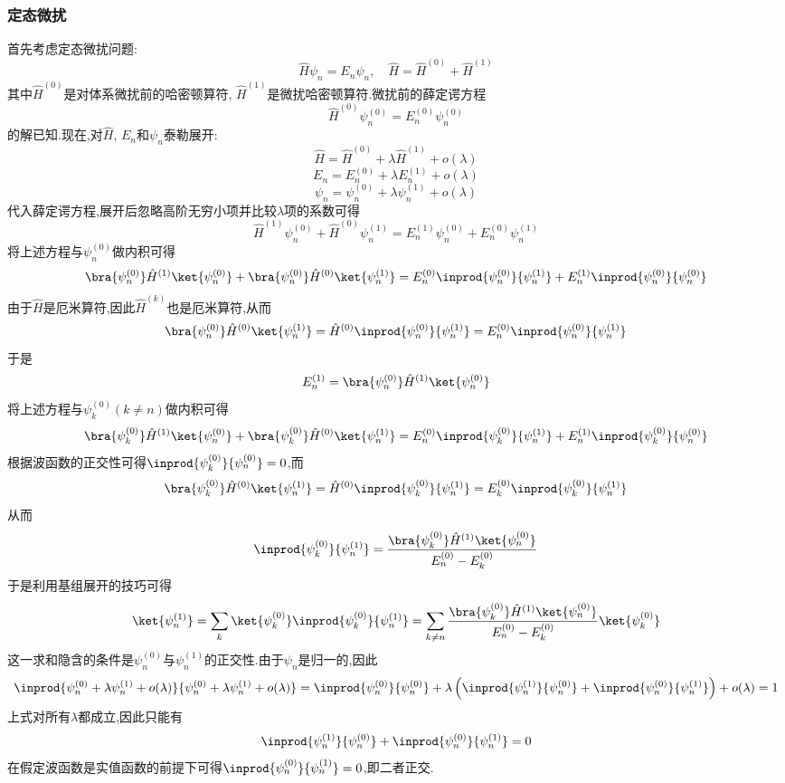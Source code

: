 \documentclass{ctexbook}
\begin{document}
\subsubsection{定态微扰}
\indent 首先考虑定态微扰问题:
\[\hat{H}\psi_n=E_n\psi_n,\quad\hat{H}=\hat{H}^{(0)}+\hat{H}^{(1)}\]
其中$\hat{H}^{(0)}$是对体系微扰前的哈密顿算符, $\hat{H}^{(1)}$是微扰哈密顿算符.微扰前的薛定谔方程
\[\hat{H}^{(0)}\psi_n^{(0)}=E_n^{(0)}\psi_n^{(0)}\]
的解已知.现在,对$\hat{H}$, $E_n$和$\psi_n$泰勒展开:
\[\hat{H}=\hat{H}^{(0)}+\lambda\hat{H}^{(1)}+o(\lambda)\]
\[E_n=E_n^{(0)}+\lambda E_n^{(1)}+o(\lambda)\]
\[\psi_n=\psi_n^{(0)}+\lambda\psi_n^{(1)}+o(\lambda)\]
代入薛定谔方程,展开后忽略高阶无穷小项并比较$\lambda$项的系数可得
\[\hat{H}^{(1)}\psi_n^{(0)}+\hat{H}^{(0)}\psi_n^{(1)}=E_n^{(1)}\psi_n^{(0)}+E_n^{(0)}\psi_n^{(1)}\]
\indent 将上述方程与$\psi_{n}^{(0)}$做内积可得
\[\bra{\psi_{n}^{(0)}}\hat{H}^{(1)}\ket{\psi_{n}^{(0)}}+\bra{\psi_{n}^{(0)}}\hat{H}^{(0)}\ket{\psi_{n}^{(1)}}=E_n^{(0)}\inprod{\psi_{n}^{(0)}}{\psi_{n}^{(1)}}+E_n^{(1)}\inprod{\psi_{n}^{(0)}}{\psi_{n}^{(0)}}\]
由于$\hat{H}$是厄米算符,因此$\hat{H}^{(k)}$也是厄米算符,从而
\[\bra{\psi_{n}^{(0)}}\hat{H}^{(0)}\ket{\psi_{n}^{(1)}}=\hat{H}^{(0)}\inprod{\psi_{n}^{(0)}}{\psi_{n}^{(1)}}=E_n^{(0)}\inprod{\psi_{n}^{(0)}}{\psi_{n}^{(1)}}\]
于是
\[E_n^{(1)}=\bra{\psi_{n}^{(0)}}\hat{H}^{(1)}\ket{\psi_{n}^{(0)}}\]
\indent 将上述方程与$\psi_k^{(0)}(k\neq n)$做内积可得
\[\bra{\psi_{k}^{(0)}}\hat{H}^{(1)}\ket{\psi_{n}^{(0)}}+\bra{\psi_{k}^{(0)}}\hat{H}^{(0)}\ket{\psi_{n}^{(1)}}=E_n^{(0)}\inprod{\psi_{k}^{(0)}}{\psi_{n}^{(1)}}+E_n^{(1)}\inprod{\psi_{k}^{(0)}}{\psi_{n}^{(0)}}\]
根据波函数的正交性可得$\inprod{\psi_{k}^{(0)}}{\psi_{n}^{(0)}}=0$,而
\[\bra{\psi_{k}^{(0)}}\hat{H}^{(0)}\ket{\psi_{n}^{(1)}}=\hat{H}^{(0)}\inprod{\psi_{k}^{(0)}}{\psi_{n}^{(1)}}=E_k^{(0)}\inprod{\psi_{k}^{(0)}}{\psi_{n}^{(1)}}\]
从而
\[\inprod{\psi_{k}^{(0)}}{\psi_{n}^{(1)}}=\dfrac{\bra{\psi_{k}^{(0)}}\hat{H}^{(1)}\ket{\psi_{n}^{(0)}}}{E_n^{(0)}-E_k^{(0)}}\]
于是利用基组展开的技巧可得
\[\ket{\psi_n^{(1)}}=\sum_{k}\ket{\psi_k^{(0)}}\inprod{\psi_{k}^{(0)}}{\psi_{n}^{(1)}}=\sum_{k\neq n}\dfrac{\bra{\psi_{k}^{(0)}}\hat{H}^{(1)}\ket{\psi_{n}^{(0)}}}{E_n^{(0)}-E_k^{(0)}}\ket{\psi_k^{(0)}}\]
这一求和隐含的条件是$\psi_{n}^{(0)}$与$\psi_{n}^{(1)}$的正交性.由于$\psi_n$是归一的,因此
\[\inprod{\psi_{n}^{(0)}+\lambda\psi_{n}^{(1)}+o(\lambda)}{\psi_{n}^{(0)}+\lambda\psi_{n}^{(1)}+o(\lambda)}=\inprod{\psi_n^{(0)}}{\psi_n^{(0)}}+\lambda\left(\inprod{\psi_n^{(1)}}{\psi_n^{(0)}}+\inprod{\psi_n^{(0)}}{\psi_n^{(1)}}\right)+o(\lambda)=1\]
上式对所有$\lambda$都成立,因此只能有
\[\inprod{\psi_n^{(1)}}{\psi_n^{(0)}}+\inprod{\psi_n^{(0)}}{\psi_n^{(1)}}=0\]
在假定波函数是实值函数的前提下可得$\inprod{\psi_n^{(0)}}{\psi_n^{(1)}}=0$,即二者正交.
\end{document}
